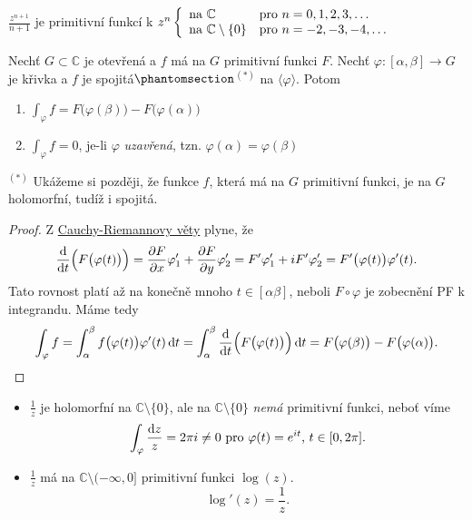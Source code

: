 \begin{example}
$\frac{z^{n+1}}{n+1}$ je primitivní funkcí k $z^n
\left\{ \begin{array}{ll} \text{na } \mathbb{C} & \mbox{pro } n=0,1,2,3, \dots \\ \text{na } \mathbb{C}\setminus\{0\} & \mbox{pro } n=-2,-3,-4, \dots \end{array} \right.$
\end{example}

\begin{theorem}
Nechť $G\subset\mathbb{C}$ je otevřená a $f$ má na $G$ primitivní funkci $F$. Nechť $\varphi:[\alpha,\beta]\rightarrow G$ je křivka a $f$ je spojitá$\phantomsection$\hyperref[$^{(*)}$end]{$^{(*)}$} \label{^{(*)}start}na $\langle\varphi\rangle$. Potom
\begin{enumerate}
    \item $\int_\varphi f=F\bigl(\varphi(\beta)\bigr)-F\bigl(\varphi(\alpha)\bigr)$
    \item $\int_\varphi f=0$, je-li $\varphi$ \emph{uzavřená}, tzn. $\varphi(\alpha)=\varphi(\beta)$
\end{enumerate}
\end{theorem}
\begin{note}
\hyperref[^{(*)}start]{$^{(*)}$} \label{$^{(*)}$end} Ukážeme si později, že funkce $f$, která má na $G$ primitivní funkci, je na $G$ holomorfní, tudíž i spojitá.
\end{note}

\begin{proof}
Z \hyperref[CR]{Cauchy-Riemannovy věty} plyne, že 
$$\frac{\mathop{}\!\mathrm{d}}{\mathop{}\!\mathrm{d} t}\Bigl(F\bigl(\varphi(t)\bigr)\Bigr)=\frac{\partial F}{\partial x}\varphi'_1+\frac{\partial F}{\partial y}\varphi'_2=F'\varphi'_1+iF'\varphi'_2=F'\bigl(\varphi(t)\bigr)\varphi'(t)\text{.}$$
Tato rovnost platí až na konečně mnoho $t\in[\alpha\beta]$, neboli $F\circ\varphi$ je zobecnění PF k integrandu.
Máme tedy
$$\int_\varphi f=\int_\alpha^\beta f\bigl(\varphi(t)\bigr)\varphi'(t)\mathop{}\!\mathrm{d} t
=\int_\alpha^\beta \frac{\mathop{}\!\mathrm{d}}{\mathop{}\!\mathrm{d} t}\Bigl(F\bigl(\varphi(t)\bigr)\Bigr)\mathop{}\!\mathrm{d} t=
F\bigl(\varphi(\beta)\bigr)-F\bigl(\varphi(\alpha)\bigr)\text{.}$$
\end{proof}

\begin{example}
\mbox{}
\begin{itemize}
    \item $\frac{1}{z}$ je holomorfní na $\mathbb{C}\setminus\{0\}$, ale na $\mathbb{C}\setminus\{0\}$ \emph{nemá} primitivní funkci, neboť víme $$\int_\varphi \frac{\mathop{}\!\mathrm{d} z}{z}=2\pi i \neq 0 \text{ pro } \varphi(t)=e^{it}\text{, } t \in [0,2\pi]\text{.}$$ 
    \item $\frac{1}{z}$ má na $\mathbb{C}\setminus(-\infty,0]$ primitivní funkci $\log(z)$. $$\log'(z)=\frac{1}{z}\text{.}$$
\end{itemize}
\end{example}

